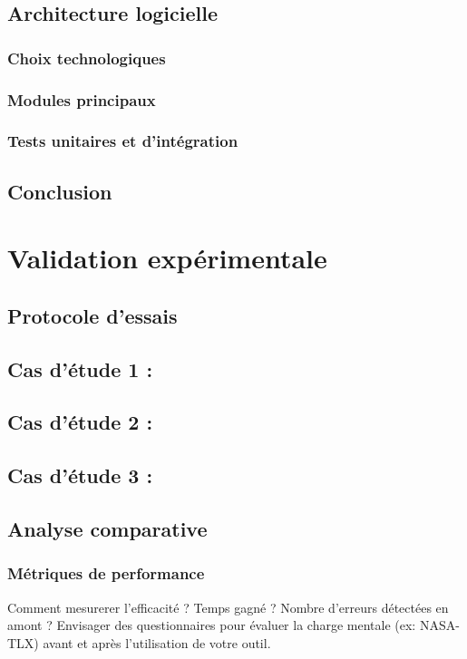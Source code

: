 \documentclass[a4paper,12pt]{article}
\begin{document}
\subsection{Architecture logicielle}
\label{sec:orgfc0b4ec}
\subsubsection{Choix technologiques}
\label{sec:org2c81d9f}
\subsubsection{Modules principaux}
\label{sec:org0aa4aa4}
\subsubsection{Tests unitaires et d'intégration}
\label{sec:org1363aca}
\subsection{Conclusion}
\label{sec:orga3ea561}
\clearpage
\section{Validation expérimentale}
\label{sec:org76d5dc8}
\subsection{Protocole d'essais}
\label{sec:org1b78366}

\subsection{Cas d'étude 1 :}
\label{sec:orga3bdd66}
\subsection{Cas d'étude 2 :}
\label{sec:org84b5226}
\subsection{Cas d'étude 3 :}
\label{sec:orgb87fb27}

\subsection{Analyse comparative}
\label{sec:org631e106}
\subsubsection{Métriques de performance}
\label{sec:orge15c701}
Comment mesurerer l'efficacité ? Temps gagné ? Nombre d'erreurs détectées en amont ?
Envisager des questionnaires pour évaluer la charge mentale (ex: NASA-TLX) avant et après l'utilisation de votre outil.
\end{document}
